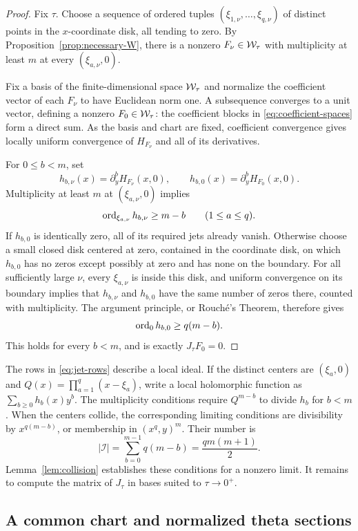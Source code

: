 \begin{proof}
Fix $\tau$. Choose a sequence of ordered tuples
$(\xi_{1,\nu},\ldots,\xi_{q,\nu})$ of distinct points in the
$x$-coordinate disk, all tending to zero. By
Proposition~\ref{prop:necessary-W}, there is a nonzero
$F_\nu\in\mathcal W_\tau$ with multiplicity at least $m$ at every
$(\xi_{a,\nu},0)$.

Fix a basis of the finite-dimensional space $\mathcal W_\tau$ and normalize
the coefficient vector of each $F_\nu$ to have Euclidean norm one.
A subsequence converges to a unit vector, defining a nonzero
$F_0\in\mathcal W_\tau$: the coefficient blocks in
\eqref{eq:coefficient-spaces} form a direct sum. As the basis and chart
are fixed, coefficient convergence gives locally uniform convergence
of $H_{F_\nu}$ and all of its derivatives.

For $0\leq b<m$, set
\[
 h_{b,\nu}(x)=\partial_y^b H_{F_\nu}(x,0),
 \qquad h_{b,0}(x)=\partial_y^b H_{F_0}(x,0).
\]
Multiplicity at least $m$ at $(\xi_{a,\nu},0)$ implies
\[
 \operatorname{ord}_{\xi_{a,\nu}}h_{b,\nu}\geq m-b
 \qquad (1\leq a\leq q).
\]
If $h_{b,0}$ is identically zero, all of its required jets already
vanish. Otherwise choose a small closed disk centered at zero,
contained in the coordinate disk, on which $h_{b,0}$ has no zeros
except possibly at zero and has none on the boundary. For all
sufficiently large $\nu$, every $\xi_{a,\nu}$ is inside this disk,
and uniform convergence on its boundary implies that $h_{b,\nu}$
and $h_{b,0}$ have the same number of zeros there, counted with
multiplicity. The argument principle, or Rouch\'e's Theorem,
therefore gives
\[
 \operatorname{ord}_0 h_{b,0}\geq q(m-b).
\]
This holds for every $b<m$, and is exactly $J_\tau F_0=0$.
\end{proof}

The rows in \eqref{eq:jet-rows} describe a local ideal. If the distinct centers are
$(\xi_a,0)$ and $Q(x)=\prod_{a=1}^q(x-\xi_a)$, write a local
holomorphic function as $\sum_{b\geq0}h_b(x)y^b$. The multiplicity
conditions require $Q^{m-b}$ to divide $h_b$ for $b<m$.
When the centers collide, the corresponding limiting conditions
are divisibility by $x^{q(m-b)}$, or membership in
$(x^q,y)^m$. Their number is
\[
 |\mathcal I|=\sum_{b=0}^{m-1}q(m-b)=\frac{qm(m+1)}2.
\]
Lemma~\ref{lem:collision} establishes these conditions for a nonzero limit.
It remains to compute the matrix of $J_\tau$ in bases suited to
$\tau\to0^+$.

\subsection{A common chart and normalized theta sections}

